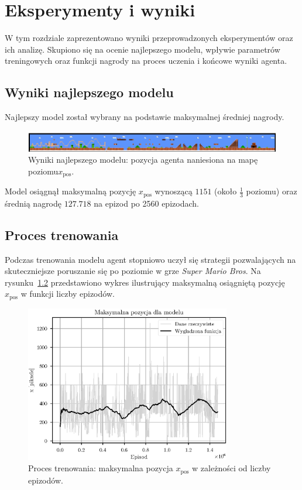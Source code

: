 \chapter{Eksperymenty i wyniki}

W tym rozdziale zaprezentowano wyniki przeprowadzonych eksperymentów oraz ich analizę. Skupiono się na ocenie najlepszego modelu, wpływie parametrów treningowych  oraz funkcji nagrody na proces uczenia i końcowe wyniki agenta.

\section{Wyniki najlepszego modelu}

Najlepszy model został wybrany na podstawie maksymalnej średniej nagrody.

\begin{figure}[!ht]
	\centering
	\includegraphics[width=\textwidth]{plots/pos.eps}
	\caption{Wyniki najlepszego modelu: pozycja agenta naniesiona na mapę poziomu\(x_{\text{pos}}\).}
	\label{fig:best_model_results}
\end{figure}

Model osiągnął maksymalną pozycję \(x_{\text{pos}}\) wynoszącą \(1151\) (około \(\frac{1}{3}\) poziomu) oraz średnią nagrodę \(127.718\) na epizod po 2560 epizodach.

\section{Proces trenowania}

Podczas trenowania modelu agent stopniowo uczył się strategii pozwalających na skuteczniejsze poruszanie się po poziomie w grze \textit{Super Mario Bros}. Na rysunku~\ref{fig:training_process} przedstawiono wykres ilustrujący maksymalną osiągniętą pozycję \(x_{\text{pos}}\) w funkcji liczby epizodów.

\begin{figure}[!ht]
	\centering
	\includegraphics[width=0.8\textwidth]{plots/max_x.eps}
	\caption{Proces trenowania: maksymalna pozycja \(x_{\text{pos}}\) w zależności od liczby epizodów.}
	\label{fig:training_process}
\end{figure}

